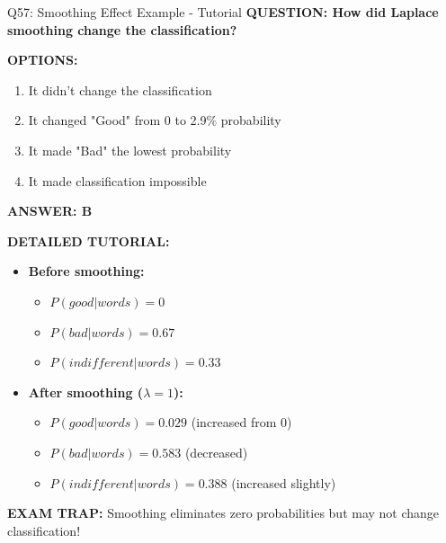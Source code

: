 \documentclass[8pt]{beamer}
\begin{document}
	\begin{frame}{Q57: Smoothing Effect Example - Tutorial}
		\fontsize{6.5}{7.5}\selectfont
		\textbf{QUESTION: How did Laplace smoothing change the classification?}
		
		\vspace{0.1cm}
		\textbf{OPTIONS:}
		\begin{enumerate}
			\item It didn't change the classification
			\item It changed "Good" from 0 to 2.9\% probability
			\item It made "Bad" the lowest probability
			\item It made classification impossible
		\end{enumerate}
		
		\vspace{0.1cm}
		\textcolor{myblue}{\textbf{ANSWER: B}}
		
		\vspace{0.1cm}
		\textbf{DETAILED TUTORIAL:}
		\begin{itemize}
			\item \textbf{Before smoothing:}
			\begin{itemize}
				\item $P(good|words) = 0$
				\item $P(bad|words) = 0.67$
				\item $P(indifferent|words) = 0.33$
			\end{itemize}
			\item \textbf{After smoothing ($\lambda = 1$):}
			\begin{itemize}
				\item $P(good|words) = 0.029$ (increased from 0)
				\item $P(bad|words) = 0.583$ (decreased)
				\item $P(indifferent|words) = 0.388$ (increased slightly)
			\end{itemize}
		\end{itemize}
		
		\textcolor{myred}{\textbf{EXAM TRAP:}} Smoothing \textcolor{myblue}{eliminates zero probabilities} but may not change classification!
	\end{frame}
	
\end{document}
